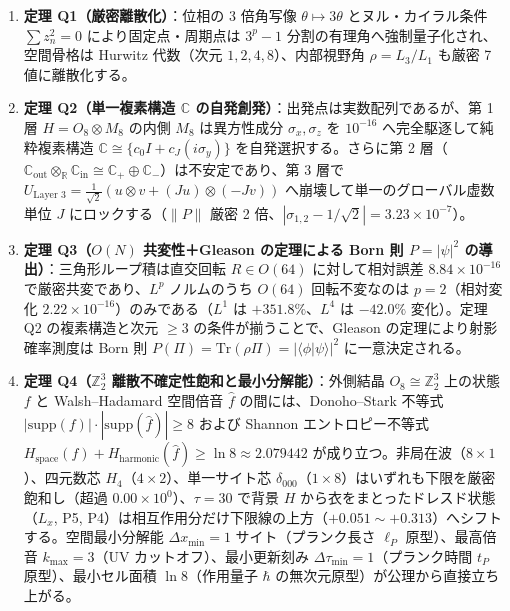 \documentclass[
  a4paper,
]{ltjsarticle}
\providecommand{\tightlist}{%
  \setlength{\itemsep}{0pt}\setlength{\parskip}{0pt}}
\begin{document}
\begin{enumerate}
\def\labelenumi{\arabic{enumi}.}
\tightlist
\item
  \textbf{定理 Q1（厳密離散化）}：位相の 3 倍角写像
  \(\theta \mapsto 3\theta\) とヌル・カイラル条件 \(\sum z_n^2 = 0\)
  により固定点・周期点は \(3^p - 1\)
  分割の有理角へ強制量子化され、空間骨格は Hurwitz 代数（次元
  \(1, 2, 4, 8\)）、内部視野角 \(\rho = L_3/L_1\) も厳密 7
  値に離散化する。
\item
  \textbf{定理 Q2（単一複素構造 \(\mathbb{C}\)
  の自発創発）}：出発点は実数配列であるが、第 1 層
  \(H = O_8 \otimes M_8\) の内側 \(M_8\) は異方性成分
  \(\sigma_x, \sigma_z\) を \(10^{-16}\) へ完全駆逐して純粋複素構造
  \(\mathbb{C} \cong \{c_0 I + c_J (i\sigma_y)\}\)
  を自発選択する。さらに第 2
  層（\(\mathbb{C}_{\mathrm{out}} \otimes_{\mathbb{R}} \mathbb{C}_{\mathrm{in}} \cong \mathbb{C}_+ \oplus \mathbb{C}_-\)）は不安定であり、第
  3 層で
  \(U_{\text{Layer 3}} = \frac{1}{\sqrt{2}}(u\otimes v + (Ju)\otimes(-Jv))\)
  へ崩壊して単一のグローバル虚数単位 \(J\) にロックする（\(\|P\|\) 厳密
  2 倍、\(|\sigma_{1,2} - 1/\sqrt{2}| = 3.23 \times 10^{-7}\)）。
\item
  \textbf{定理 Q3（\(O(N)\) 共変性＋Gleason の定理による Born 則
  \(P = |\psi|^2\) の導出）}：三角形ループ積は直交回転 \(R \in O(64)\)
  に対して相対誤差 \(8.84 \times 10^{-16}\) で厳密共変であり、\(L^p\)
  ノルムのうち \(O(64)\) 回転不変なのは \(p = 2\)（相対変化
  \(2.22 \times 10^{-16}\)）のみである（\(L^1\) は \(+351.8\%\)、\(L^4\)
  は \(-42.0\%\) 変化）。定理 Q2 の複素構造と次元 \(\ge 3\)
  の条件が揃うことで、Gleason の定理により射影確率測度は Born 則
  \(P(\Pi) = \mathrm{Tr}(\rho\Pi) = |\langle\phi|\psi\rangle|^2\)
  に一意決定される。
\item
  \textbf{定理 Q4（\(\mathbb{Z}_2^3\)
  離散不確定性飽和と最小分解能）}：外側結晶 \(O_8 \cong \mathbb{Z}_2^3\)
  上の状態 \(f\) と Walsh--Hadamard 空間倍音 \(\hat{f}\)
  の間には、Donoho--Stark 不等式
  \(|\mathrm{supp}(f)|\cdot|\mathrm{supp}(\hat{f})| \ge 8\) および
  Shannon エントロピー不等式
  \(H_{\mathrm{space}}(f) + H_{\mathrm{harmonic}}(\hat{f}) \ge \ln 8 \approx 2.079442\)
  が成り立つ。非局在波（\(8\times 1\)）、四元数芯
  \(H_4\)（\(4\times 2\)）、単一サイト芯
  \(\delta_{000}\)（\(1\times 8\)）はいずれも下限を厳密飽和し（超過
  \(0.00 \times 10^0\)）、\(\tau = 30\) で背景 \(H\)
  から衣をまとったドレスド状態（\(L_x\), P5,
  P4）は相互作用分だけ下限線の上方（\(+0.051 \sim +0.313\)）へシフトする。空間最小分解能
  \(\Delta x_{\min} = 1\) サイト（プランク長さ \(\ell_P\)
  原型）、最高倍音 \(k_{\max} = 3\)（UV カットオフ）、最小更新刻み
  \(\Delta\tau_{\min} = 1\)（プランク時間 \(t_P\) 原型）、最小セル面積
  \(\ln 8\)（作用量子 \(\hbar\) の無次元原型）が公理から直接立ち上がる。
\end{enumerate}
\end{document}
